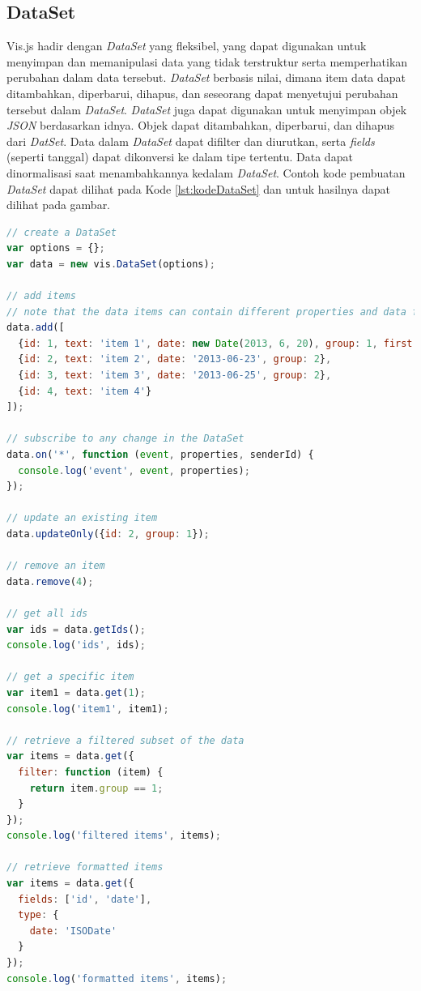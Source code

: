 \subsection{DataSet}
Vis.js hadir dengan \textit{DataSet} yang fleksibel, yang dapat digunakan untuk menyimpan dan memanipulasi data yang tidak terstruktur serta memperhatikan perubahan dalam data tersebut. \textit{DataSet} berbasis nilai, dimana item data dapat ditambahkan, diperbarui, dihapus, dan seseorang dapat menyetujui perubahan tersebut dalam \textit{DataSet}. \textit{DataSet} juga dapat digunakan untuk menyimpan objek \textit{JSON} berdasarkan idnya. Objek dapat ditambahkan, diperbarui, dan dihapus dari \textit{DatSet}. Data dalam \textit{DataSet} dapat difilter dan diurutkan, serta \textit{fields} (seperti tanggal) dapat dikonversi ke dalam tipe tertentu. Data dapat dinormalisasi saat menambahkannya kedalam \textit{DataSet}. Contoh kode pembuatan \textit{DataSet} dapat dilihat pada Kode \ref{lst:kodeDataSet} dan untuk hasilnya dapat dilihat pada gambar.

\begin{lstlisting}[language=JavaScript, caption=Contoh kode untuk membuat \textit{DataSet} menggunakan \textit{vis.js}\label{lst:kodeDataSet}]
// create a DataSet
var options = {};
var data = new vis.DataSet(options);

// add items
// note that the data items can contain different properties and data formats
data.add([
  {id: 1, text: 'item 1', date: new Date(2013, 6, 20), group: 1, first: true},
  {id: 2, text: 'item 2', date: '2013-06-23', group: 2},
  {id: 3, text: 'item 3', date: '2013-06-25', group: 2},
  {id: 4, text: 'item 4'}
]);

// subscribe to any change in the DataSet
data.on('*', function (event, properties, senderId) {
  console.log('event', event, properties);
});

// update an existing item
data.updateOnly({id: 2, group: 1});

// remove an item
data.remove(4);

// get all ids
var ids = data.getIds();
console.log('ids', ids);

// get a specific item
var item1 = data.get(1);
console.log('item1', item1);

// retrieve a filtered subset of the data
var items = data.get({
  filter: function (item) {
    return item.group == 1;
  }
});
console.log('filtered items', items);

// retrieve formatted items
var items = data.get({
  fields: ['id', 'date'],
  type: {
    date: 'ISODate'
  }
});
console.log('formatted items', items);
\end{lstlisting}

